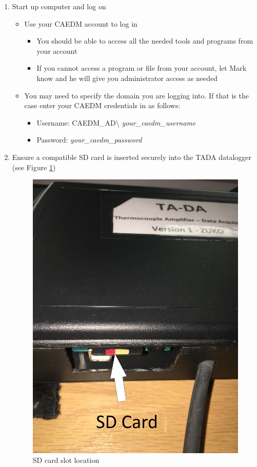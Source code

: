 \documentclass[letterpaper,11pt]{article}
\begin{document}
\begin{enumerate}
    \item Start up computer and log on
        \begin{itemize}
      
        \item Use your CAEDM account to log in
            \begin{itemize}
            \item You should be able to access all the needed tools and 
                programs from your account
            \item If you cannot access a program or file from your account, let 
                Mark know and he will give you administrator access as needed
            \end{itemize}
        
        \item You may need to specify the domain you are logging into. If that 
            is the case enter your CAEDM credentials in as follows:
            \begin{itemize}
            \item Username: CAEDM\_AD\textbackslash
            \textit{your\_caedm\_username}
            \item Password: \textit{your\_caedm\_password}
            \end{itemize}
        
        
        \end{itemize}
    
    \item Ensure a compatible SD card is inserted securely into the TADA 
        datalogger (see Figure \ref{fig:sd_card_reader})
        
\begin{figure}[H]
\centering
\includegraphics[width=.3\textwidth]{sd_card_reader.jpg}
\caption{SD card slot location}
\label{fig:sd_card_reader}
\end{figure}
        

\end{enumerate}
\end{document}

